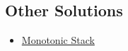 \subsection*{Other Solutions}
\begin{itemize}
\item \hyperref[solution:lc0042_monotonic_stack]{Monotonic Stack}
\end{itemize}
